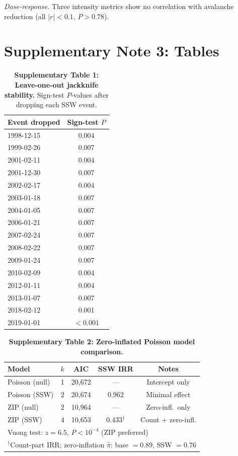 \documentclass[11pt,letterpaper]{article}
\begin{document}
\textit{Dose-response.} Three intensity metrics show no correlation with avalanche reduction (all $|r| < 0.1$, $P > 0.78$).

\section{Supplementary Note 3: Tables}

\begin{table}[!ht]
\centering
\caption{\textbf{Supplementary Table 1: Leave-one-out jackknife stability.}
Sign-test $P$-values after dropping each SSW event.}
\label{stab:loo}
\small
\begin{tabular}{lc}
\toprule
Event dropped & Sign-test $P$ \\
\midrule
1998-12-15 & 0.004 \\
1999-02-26 & 0.007 \\
2001-02-11 & 0.004 \\
2001-12-30 & 0.007 \\
2002-02-17 & 0.004 \\
2003-01-18 & 0.007 \\
2004-01-05 & 0.007 \\
2006-01-21 & 0.007 \\
2007-02-24 & 0.007 \\
2008-02-22 & 0.007 \\
2009-01-24 & 0.007 \\
2010-02-09 & 0.004 \\
2012-01-11 & 0.004 \\
2013-01-07 & 0.007 \\
2018-02-12 & 0.001 \\
2019-01-01 & $< 0.001$ \\
\bottomrule
\end{tabular}
\end{table}

\begin{table}[!ht]
\centering
\caption{\textbf{Supplementary Table 2: Zero-inflated Poisson model comparison.}}
\label{stab:zip}
\small
\begin{tabular}{lcccc}
\toprule
Model & $k$ & AIC & SSW IRR & Notes \\
\midrule
Poisson (null) & 1 & 20{,}672 & --- & Intercept only \\
Poisson (SSW) & 2 & 20{,}674 & 0.962 & Minimal effect \\
ZIP (null) & 2 & 10{,}964 & --- & Zero-infl.\ only \\
ZIP (SSW) & 4 & 10{,}653 & 0.433$^\dagger$ & Count + zero-infl. \\
\midrule
\multicolumn{5}{l}{Vuong test: $z = 6.5$, $P < 10^{-4}$ (ZIP preferred)} \\
\multicolumn{5}{l}{$^\dagger$Count-part IRR; zero-inflation $\hat{\pi}$: base $= 0.89$, SSW $= 0.76$} \\
\bottomrule
\end{tabular}
\end{table}
\end{document}

